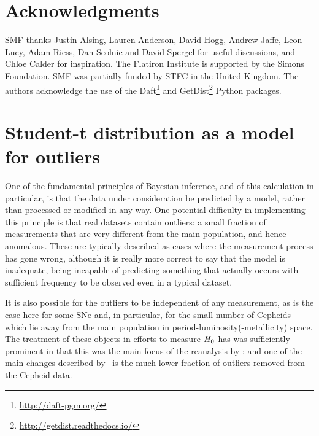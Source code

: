 \documentclass[a4paper,fleqn,usenatbib]{mnras}
\newcommand{\riess}{\citetalias{Riess_etal:2016}}
\begin{document}
{%

\section*{Acknowledgments}

SMF thanks Justin Alsing, Lauren Anderson, David Hogg, Andrew Jaffe, Leon Lucy, Adam Riess, Dan Scolnic and David Spergel for useful discussions, and Chloe Calder for inspiration. The Flatiron Institute is supported by the Simons Foundation. SMF was partially funded by STFC in the United Kingdom. The authors acknowledge the use of the Daft\footnote{\url{http://daft-pgm.org/}} and GetDist\footnote{\url{http://getdist.readthedocs.io/}} Python packages.






\appendix
\section{Student-t distribution as a model for outliers}
\label{section:dof_prior}

One of the fundamental principles of Bayesian inference,
and of this calculation in particular, 
is that the data under consideration be predicted by a model,
rather than processed or modified in any way.
One potential difficulty in implementing this principle is that
real datasets contain outliers:
a small fraction of measurements that are very different from the 
main population, and hence anomalous.
These are typically described as cases where the measurement process has 
gone wrong, although it is really more correct to say that the 
model is inadequate, being incapable of predicting something that 
actually occurs with sufficient frequency to be observed even in a
typical dataset.

It is also possible for the outliers to be independent of any 
measurement, as is the case here for some SNe and,
in particular, for the small number of Cepheids which lie away from the main 
population in period-luminosity(-metallicity) space.
The treatment of these objects in efforts to measure 
$H_0$ has was sufficiently prominent in 
\cite{Riess_etal:2011} that this was the main focus of the
reanalysis by \cite{Efstathiou:2014};
and one of the main changes described by \riess\ is 
the much lower fraction of outliers removed from the Cepheid data.

}
\end{document}
